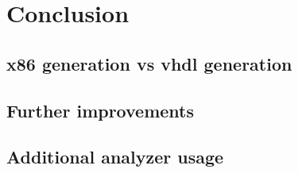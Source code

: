 \chapter{Conclusion}\label{sec:conclusion}

\section{x86 generation vs vhdl generation}

\section{Further improvements}

\section{Additional analyzer usage}